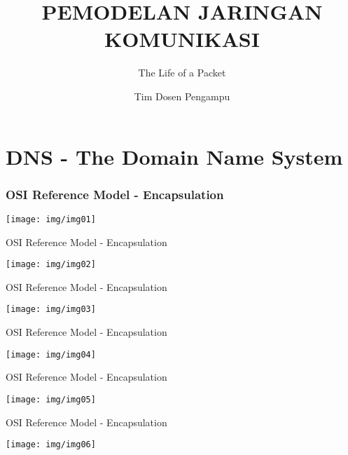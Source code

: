 \documentclass[pdflatex,compress,mathserif]{beamer}
\title{PEMODELAN JARINGAN KOMUNIKASI}
\subtitle{The Life of a Packet}
\author{Tim Dosen Pengampu}
\begin{document}
\maketitle

\section{DNS - The Domain Name System}

\begin{frame}
	\frametitle{OSI Reference Model - Encapsulation}
	\begin{center}
		\texttt{[image: img/img01]}
	\end{center}
\end{frame}

\begin{frame}{OSI Reference Model - Encapsulation}
	\begin{center}
		\texttt{[image: img/img02]}
	\end{center}
\end{frame}

\begin{frame}{OSI Reference Model - Encapsulation}
	\begin{center}
		\texttt{[image: img/img03]}
	\end{center}
\end{frame}

\begin{frame}{OSI Reference Model - Encapsulation}
	\begin{center}
		\texttt{[image: img/img04]}
	\end{center}
\end{frame}

\begin{frame}{OSI Reference Model - Encapsulation}
	\begin{center}
		\texttt{[image: img/img05]}
	\end{center}
\end{frame}

\begin{frame}{OSI Reference Model - Encapsulation}
	\begin{center}
		\texttt{[image: img/img06]}
	\end{center}
\end{frame}
\end{document}
